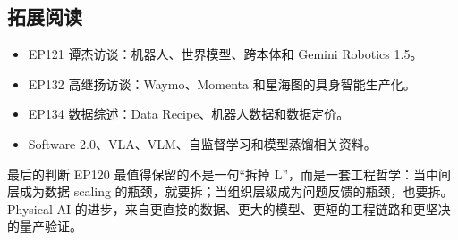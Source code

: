 \documentclass[a4paper]{article}
\begin{document}
\subsection{拓展阅读}

\begin{itemize}
\item EP121 谭杰访谈：机器人、世界模型、跨本体和 Gemini Robotics 1.5。
\item EP132 高继扬访谈：Waymo、Momenta 和星海图的具身智能生产化。
\item EP134 数据综述：Data Recipe、机器人数据和数据定价。
\item Software 2.0、VLA、VLM、自监督学习和模型蒸馏相关资料。
\end{itemize}

\begin{importantbox}{最后的判断}
EP120 最值得保留的不是一句“拆掉 L”，而是一套工程哲学：当中间层成为数据 scaling 的瓶颈，就要拆；当组织层级成为问题反馈的瓶颈，也要拆。Physical AI 的进步，来自更直接的数据、更大的模型、更短的工程链路和更坚决的量产验证。
\end{importantbox}
\end{document}

